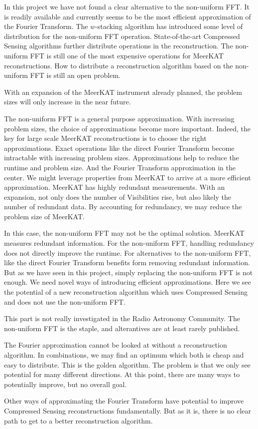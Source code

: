 In this project we have not found a clear alternative to the non-uniform FFT. It is readily available and currently seems to be the most efficient approximation of the Fourier Transform. The $w$-stacking algorithm\cite{offringa2014wsclean} has introduced some level of distribution for the non-uniform FFT operation. State-of-the-art Compressed Sensing algorithms\cite{dabbech2018cygnus, pratley2018fast} further distribute operations in the reconstruction.
The non-uniform FFT is still one of the most expensive operations for MeerKAT reconstructions. How to distribute a reconstruction algorithm based on the non-uniform FFT is still an open problem.

With an expansion of the MeerKAT instrument already planned, the problem sizes will only increase in the near future.

The non-uniform FFT is a general purpose approximation.
With increasing problem sizes, the choice of approximations become more important. Indeed, the key for large scale MeerKAT reconstructions is to choose the right approximations. Exact operations like the direct Fourier Transform become intractable with increasing problem sizes. Approximations help to reduce the runtime and problem size. And the Fourier Transform approximation in the center.
  We might leverage properties from MeerKAT to arrive at a more efficient approximation. MeerKAT has highly redundant measurements. With an expansion, not only does the number of Visibilities rise, but also likely the number of redundant data. By accounting for redundancy, we may reduce the problem size of MeerKAT.

In this case, the non-uniform FFT may not be the optimal solution. MeerKAT measures redundant information. For the non-uniform FFT, handling redundancy does not directly improve the runtime. For alternatives to the non-uniform FFT, like the direct Fourier Transform benefits form removing redundant information. But as we have seen in this project, simply replacing the non-uniform FFT is not enough. We need novel ways of introducing efficient approximations. Here we see the potential of a new reconstruction algorithm which uses Compressed Sensing and does not use the non-uniform FFT.

This part is not really investigated in the Radio Astronomy Community. The non-uniform FFT is the staple, and alterantives are at least rarely published.

The Fourier approximation cannot be looked at without a reconstruction algorithm. In combinations, we may find an optimum which both is cheap and easy to distribute. This is the golden algorithm. The problem is that we only see potential for many different directions. At this point, there are many ways to potentially improve, but no overall goal.


Other ways of approximating the Fourier Transform have potential to improve Compressed Sensing reconstructions fundamentally. But as it is, there is no clear path to get to a better reconstruction algorithm. 






